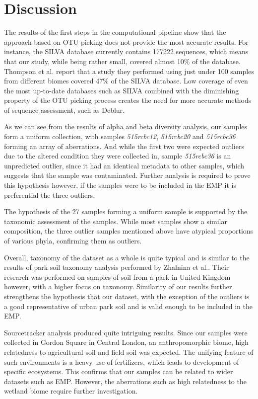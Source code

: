 \documentclass[12pt,twocolumn]{article} %
\begin{document}
\section{Discussion}
The results of the first steps in the computational pipeline show that the approach based on OTU picking does not provide the most accurate results. For instance, the SILVA database currently contains 177222 sequences, which means that our study, while being rather small, covered almost 10\% of the database. Thompson et al.\cite{Thompson2017} report that a study they performed using just under 100 samples from different biomes covered  47\% of the SILVA database. Low coverage of even the most up-to-date databases such as SILVA combined with the diminishing property of the OTU picking process creates the need for more accurate methods of sequence assessment, such as Deblur\cite{Amir}. 
\par
As we can see from the results of alpha and beta diversity analysis, our samples form a uniform collection, with samples \textit{515rcbc12}, \textit{515rcbc20} and \textit{515rcbc36} forming an array of aberrations. And while the first two were expected outliers due to the altered condition they were collected in, sample \textit{515rcbc36} is an unpredicted outlier, since it had an identical metadata to other samples, which suggests that the sample was contaminated. Further analysis is required to prove this hypothesis however, if the samples were to be included in the EMP it is preferential the three outliers.
\par
The hypothesis of the 27 samples forming a uniform sample is supported by the taxonomic assessment of the samples. While most samples show a similar composition, the three outlier samples mentioned above have atypical proportions of various phyla, confirming them as outliers.
\par
Overall, taxonomy of the dataset as a whole is quite typical and is similar to the results of park soil taxonomy analysis performed by Zhalnina et al.\cite{Zhalnina2014}. Their research was performed on samples of soil from a park in United Kingdom however, with a higher focus on taxonomy. Similarity of our results further strengthens the hypothesis that our dataset, with the exception of the outliers is a good representative of urban park soil and is valid enough to be included in the EMP.
\par
Sourcetracker analysis produced quite intriguing results.  Since our samples were collected in Gordon Square in Central London, an anthropomorphic biome, high relatedness to agricultural soil and field soil was expected. The unifying feature of such environments is a heavy use of fertilizers, which leads to development of specific ecosystems. This confirms that our samples can be related to wider datasets such as EMP. However, the aberrations such as high relatedness to the wetland biome require further investigation.
\end{document}
